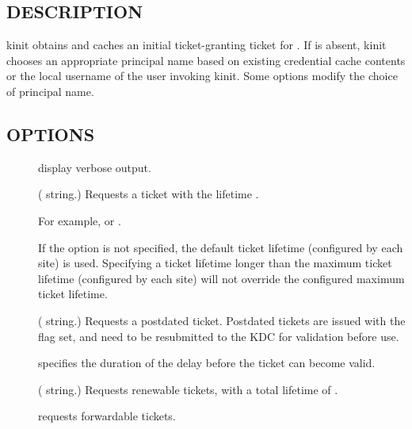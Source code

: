 \documentclass[letterpaper,10pt,english]{sphinxmanual}
\begin{document}
\subsection{DESCRIPTION}
\label{\detokenize{user/user_commands/kinit:description}}
kinit obtains and caches an initial ticket-granting ticket for
.  If  is absent, kinit chooses an appropriate
principal name based on existing credential cache contents or the
local username of the user invoking kinit.  Some options modify the
choice of principal name.


\subsection{OPTIONS}
\label{\detokenize{user/user_commands/kinit:options}}\begin{description}
\item[{}] \leavevmode
display verbose output.

\item[{ }] \leavevmode
( string.)  Requests a ticket with the lifetime
.

For example,  or .

If the  option is not specified, the default ticket lifetime
(configured by each site) is used.  Specifying a ticket lifetime
longer than the maximum ticket lifetime (configured by each site)
will not override the configured maximum ticket lifetime.

\item[{ }] \leavevmode
( string.)  Requests a postdated ticket.  Postdated
tickets are issued with the  flag set, and need to be
resubmitted to the KDC for validation before use.

 specifies the duration of the delay before the ticket
can become valid.

\item[{ }] \leavevmode
( string.)  Requests renewable tickets, with a total
lifetime of .

\item[{}] \leavevmode
requests forwardable tickets.


\end{description}
\end{document}
